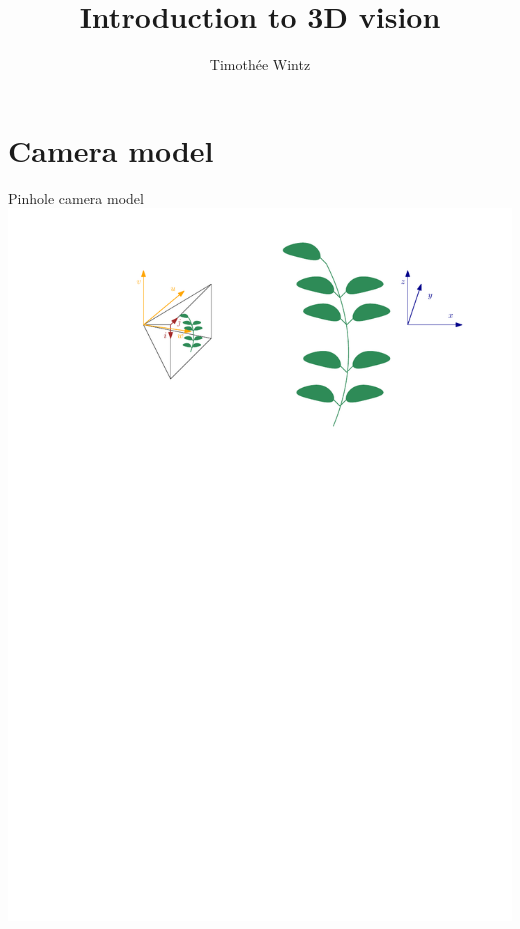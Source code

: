 \documentclass{beamer}
\title{Introduction to 3D vision}
\author{Timothée Wintz}\institute{Sony CSL Paris}
\begin{document}
\begin{frame}
\titlepage
\end{frame}

\section{Camera model}

\begin{frame}
    \tableofcontents
\end{frame}

\begin{frame}
    \tableofcontents[sectionstyle=show/shaded]
\end{frame}

\begin{frame}{Pinhole camera model}
    \centering
    \includegraphics[width=\textwidth]{images/reperes.pdf}
\end{frame}
\end{document}
